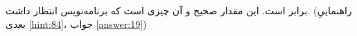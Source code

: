 \section{}
\paragraph{}\label{hint:303}
 برابر  است. این مقدار صحیح و آن چیزی است که برنامه‌نویس انتظار داشت. (راهنماییِ بعدی \ref{hint:84}، جواب \ref{answer:19})